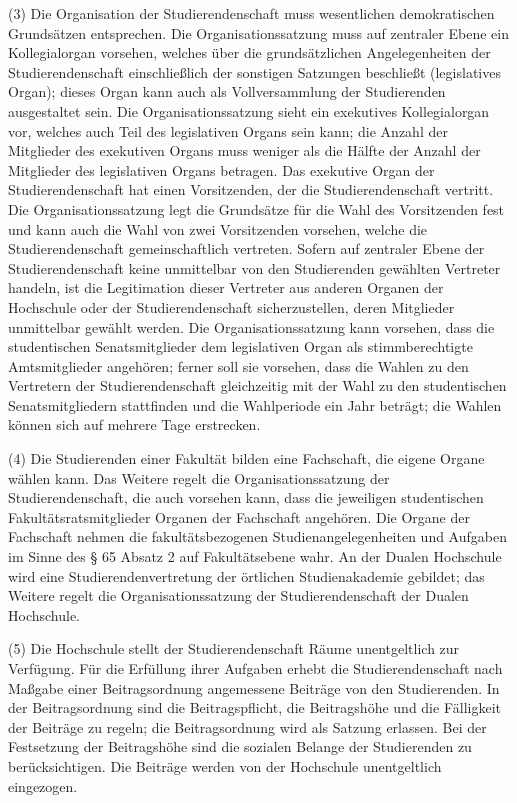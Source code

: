 \documentclass[
10pt,
a4paper,
twoside,								%
titlepage=false,							%
draft=false								%
]{scrartcl}
\begin{document}
(3) Die Organisation der Studierendenschaft muss wesentlichen demokratischen Grundsätzen entsprechen. Die Organisationssatzung muss auf zentraler Ebene ein Kollegialorgan vorsehen, welches über die grundsätzlichen Angelegenheiten der Studierendenschaft einschließlich der sonstigen Satzungen beschließt (legislatives Organ); dieses Organ kann auch als Vollversammlung der Studierenden ausgestaltet sein. Die Organisationssatzung sieht ein exekutives Kollegialorgan vor, welches auch Teil des legislativen Organs sein kann; die Anzahl der Mitglieder des exekutiven Organs muss weniger als die Hälfte der Anzahl der Mitglieder des legislativen Organs betragen. Das exekutive Organ der Studierendenschaft hat einen Vorsitzenden, der die Studierendenschaft vertritt. Die Organisationssatzung legt die Grundsätze für die Wahl des Vorsitzenden fest und kann auch die Wahl von zwei Vorsitzenden vorsehen, welche die Studierendenschaft gemeinschaftlich vertreten. Sofern auf zentraler Ebene der Studierendenschaft keine unmittelbar von den Studierenden gewählten Vertreter handeln, ist die Legitimation dieser Vertreter aus anderen Organen der Hochschule oder der Studierendenschaft sicherzustellen, deren Mitglieder unmittelbar gewählt werden. Die Organisationssatzung kann vorsehen, dass die studentischen Senatsmitglieder dem legislativen Organ als stimmberechtigte Amtsmitglieder angehören; ferner soll sie vorsehen, dass die Wahlen zu den Vertretern der Studierendenschaft gleichzeitig mit der Wahl zu den studentischen Senatsmitgliedern stattfinden und die Wahlperiode ein Jahr beträgt; die Wahlen können sich auf mehrere Tage erstrecken.

(4) Die Studierenden einer Fakultät bilden eine Fachschaft, die eigene Organe wählen kann. Das Weitere regelt die Organisationssatzung der Studierendenschaft, die auch vorsehen kann, dass die jeweiligen studentischen Fakultätsratsmitglieder Organen der Fachschaft angehören. Die Organe der Fachschaft nehmen die fakultätsbezogenen Studienangelegenheiten und Aufgaben im Sinne des § 65 Absatz 2 auf Fakultätsebene wahr. An der Dualen Hochschule wird eine Studierendenvertretung der örtlichen Studienakademie gebildet; das Weitere regelt die Organisationssatzung der Studierendenschaft der Dualen Hochschule.

(5) Die Hochschule stellt der Studierendenschaft Räume unentgeltlich zur Verfügung. Für die Erfüllung ihrer Aufgaben erhebt die Studierendenschaft nach Maßgabe einer Beitragsordnung angemessene Beiträge von den Studierenden. In der Beitragsordnung sind die Beitragspflicht, die Beitragshöhe und die Fälligkeit der Beiträge zu regeln; die Beitragsordnung wird als Satzung erlassen. Bei der Festsetzung der Beitragshöhe sind die sozialen Belange der Studierenden zu berücksichtigen. Die Beiträge werden von der Hochschule unentgeltlich eingezogen.
\end{document}
